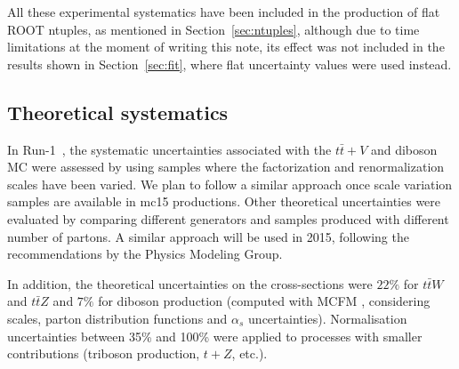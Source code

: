 All these experimental systematics have been included in the production of flat ROOT ntuples, as mentioned in Section~\ref{sec:ntuples}, although due to time limitations at the moment of writing this note, its effect was not included 
in the results shown in Section~\ref{sec:fit}, where flat uncertainty values were used instead.

\subsection{Theoretical systematics}
\label{sec:syst_theo}

In Run-1~\cite{paperSS3L,noteSS3L}, the systematic uncertainties associated with the $t \bar{t} + V$ and
diboson MC were assessed by using samples where the factorization and
renormalization scales have been varied. We plan to follow a similar approach once 
scale variation samples are available in mc15 productions.
Other theoretical uncertainties were evaluated by comparing different generators and samples produced with different
number of partons. A similar approach will be used in 2015, following the recommendations by the Physics Modeling Group.

In addition, the theoretical uncertainties on the cross-sections were $22\%$ for $t\bar{t}W$ \cite{Campbell:2012dh} 
and $t\bar{t}Z$ \cite{Garzelli:2012bn} and $7\%$ for 	diboson production (computed with MCFM \cite{Campbell:2011bn}, 
considering scales, parton distribution functions and $\alpha_s$ uncertainties). 
Normalisation uncertainties between 35\% and 100\% were applied to processes with smaller contributions (triboson 
production, $t+Z$, etc.).


